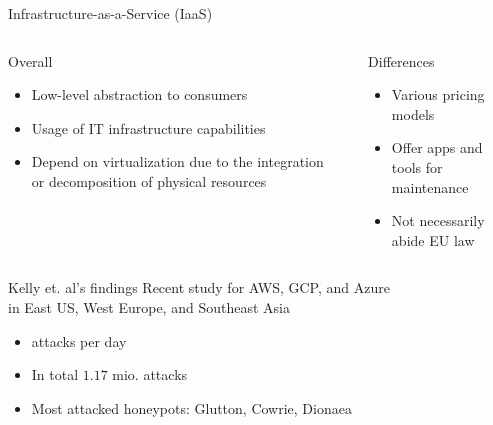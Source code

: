 \begin{frame}{Infrastructure-as-a-Service (IaaS)}
    \begin{columns}[T]
        \begin{column}{0.5\textwidth}
            \begin{center}
                Overall
            \end{center}
            \begin{itemize}
                \item Low-level abstraction to consumers
                \item Usage of IT infrastructure capabilities
                \item Depend on virtualization due to the integration or decomposition of physical resources
            \end{itemize}
        \end{column}
        \begin{column}{.02\textwidth}
            \rule{.1mm}{0.7\textheight}
        \end{column}
        \begin{column}{0.5\textwidth}
            \begin{center}
                Differences
            \end{center}
            \begin{itemize}
                \item Various pricing models
                \item Offer apps and tools for maintenance
                \item Not necessarily abide EU law
            \end{itemize}
        \end{column}
    \end{columns}
\end{frame}

\begin{frame}{Kelly et. al's findings}
    Recent study for AWS, GCP, and Azure\\
    in East US, West Europe, and Southeast Asia
    \begin{itemize}
        \item {} attacks per day
        \item In total $1.17$ mio. attacks
        \item Most attacked honeypots: Glutton, Cowrie, Dionaea
    \end{itemize}
\end{frame}

